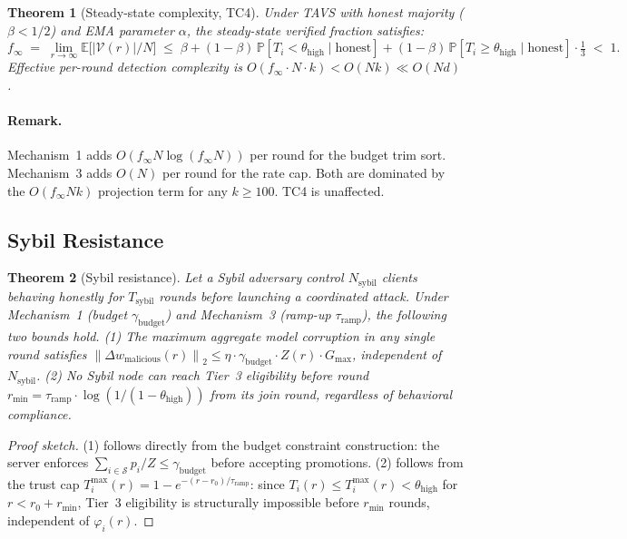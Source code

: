 \documentclass{article}
\newtheorem{theorem}{Theorem}
\newcommand{\E}{\mathbb{E}}
\renewcommand{\Pr}{\mathbb{P}}
\newcommand{\norm}[1]{\left\lVert #1 \right\rVert}
\newcommand{\calV}{\mathcal{V}}      %
\newcommand{\calS}{\mathcal{S}}      %
\newcommand{\finf}{f_{\infty}}       %
\newcommand{\TAVS}{\textsc{TAVS}}
\begin{document}
\begin{theorem}[Steady-state complexity, TC4]
\label{thm:complexity}
Under \TAVS{} with honest majority ($\beta < 1/2$) and EMA parameter $\alpha$,
the steady-state verified fraction satisfies:
\[
  \finf
  \;=\;
  \lim_{r \to \infty} \E\bigl[|\calV(r)|/N\bigr]
  \;\leq\;
  \beta
  + (1{-}\beta)\,\Pr[T_i < \theta_{\mathrm{high}} \mid \text{honest}]
  + (1{-}\beta)\,\Pr[T_i \geq \theta_{\mathrm{high}} \mid \text{honest}] \cdot \tfrac{1}{3}
  \;<\; 1.
\]
Effective per-round detection complexity is $O(\finf \cdot N \cdot k) < O(Nk) \ll O(Nd)$.
\end{theorem}

\paragraph{Remark.}
Mechanism~1 adds $O(\finf N \log(\finf N))$ per round for the budget trim sort.
Mechanism~3 adds $O(N)$ per round for the rate cap.
Both are dominated by the $O(\finf Nk)$ projection term for any $k \geq 100$.
TC4 is unaffected.

\subsection{Sybil Resistance}

\begin{theorem}[Sybil resistance]
\label{thm:sybil}
Let a Sybil adversary control $N_{\mathrm{sybil}}$ clients behaving honestly
for $T_{\mathrm{sybil}}$ rounds before launching a coordinated attack.
Under Mechanism~1 (budget $\gamma_{\mathrm{budget}}$) and
Mechanism~3 (ramp-up $\tau_{\mathrm{ramp}}$), the following two bounds hold.
\emph{(1)} The maximum aggregate model corruption in any single round satisfies
$\norm{\Delta w_{\mathrm{malicious}}(r)}_2 \leq \eta \cdot \gamma_{\mathrm{budget}} \cdot Z(r) \cdot G_{\max}$,
independent of $N_{\mathrm{sybil}}$.
\emph{(2)} No Sybil node can reach Tier~3 eligibility before round
$r_{\min} = \tau_{\mathrm{ramp}} \cdot \log(1/(1-\theta_{\mathrm{high}}))$
from its join round, regardless of behavioral compliance.
\end{theorem}

\begin{proof}[Proof sketch]
(1) follows directly from the budget constraint construction: the server
enforces $\sum_{i \in \calS} p_i / Z \leq \gamma_{\mathrm{budget}}$ before
accepting promotions.
(2) follows from the trust cap $T_i^{\max}(r) = 1 - e^{-(r-r_0)/\tau_{\mathrm{ramp}}}$:
since $T_i(r) \leq T_i^{\max}(r) < \theta_{\mathrm{high}}$ for
$r < r_0 + r_{\min}$, Tier~3 eligibility is structurally impossible before
$r_{\min}$ rounds, independent of $\varphi_i(r)$.
\end{proof}
\end{document}
